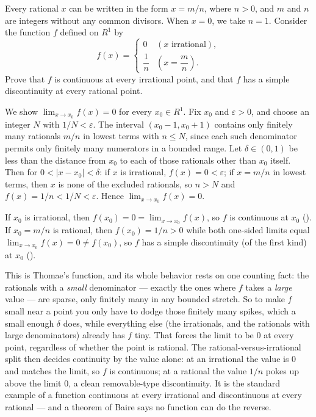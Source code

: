 \documentclass[main.tex]{subfiles}
\begin{document}
Every rational $x$ can be written in the form $x = m/n$, where $n > 0$, and $m$ and $n$ are integers without any common divisors. When $x = 0$, we take $n = 1$. Consider the function $f$ defined on $R^{1}$ by
\[
f(x) =
\begin{cases}
0 & (x \text{ irrational}), \\[2pt]
\dfrac{1}{n} & \left(x = \dfrac{m}{n}\right).
\end{cases}
\]
Prove that $f$ is continuous at every irrational point, and that $f$ has a simple discontinuity at every rational point.
\begin{Solution}
We show $\lim_{x \to x_{0}} f(x) = 0$ for every $x_{0} \in R^{1}$. Fix $x_{0}$ and $\varepsilon > 0$, and choose an integer $N$ with $1/N < \varepsilon$. The interval $(x_{0} - 1, x_{0} + 1)$ contains only finitely many rationals $m/n$ in lowest terms with $n \le N$, since each such denominator permits only finitely many numerators in a bounded range. Let $\delta \in (0, 1)$ be less than the distance from $x_{0}$ to each of those rationals other than $x_{0}$ itself. Then for $0 < |x - x_{0}| < \delta$: if $x$ is irrational, $f(x) = 0 < \varepsilon$; if $x = m/n$ in lowest terms, then $x$ is none of the excluded rationals, so $n > N$ and $f(x) = 1/n < 1/N < \varepsilon$. Hence $\lim_{x \to x_{0}} f(x) = 0$.

If $x_{0}$ is irrational, then $f(x_{0}) = 0 = \lim_{x \to x_{0}} f(x)$, so $f$ is continuous at $x_{0}$ (). If $x_{0} = m/n$ is rational, then $f(x_{0}) = 1/n > 0$ while both one-sided limits equal $\lim_{x \to x_{0}} f(x) = 0 \ne f(x_{0})$, so $f$ has a simple discontinuity (of the first kind) at $x_{0}$ ().
\end{Solution}
\begin{Reflection}
This is Thomae's function, and its whole behavior rests on one counting fact: the rationals with a \emph{small} denominator --- exactly the ones where $f$ takes a \emph{large} value --- are sparse, only finitely many in any bounded stretch. So to make $f$ small near a point you only have to dodge those finitely many spikes, which a small enough $\delta$ does, while everything else (the irrationals, and the rationals with large denominators) already has $f$ tiny. That forces the limit to be $0$ at every point, regardless of whether the point is rational. The rational-versus-irrational split then decides continuity by the value alone: at an irrational the value is $0$ and matches the limit, so $f$ is continuous; at a rational the value $1/n$ pokes up above the limit $0$, a clean removable-type discontinuity. It is the standard example of a function continuous at every irrational and discontinuous at every rational --- and a theorem of Baire says no function can do the reverse.
\end{Reflection}
\end{document}
